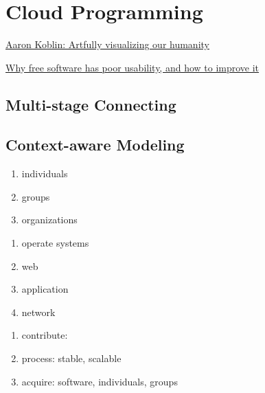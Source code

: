 \documentclass[draftclsnofoot,journal,onecolumn,12pt]{IEEEtran}
\begin{document}
\section{Cloud Programming}

\href{http://www.ted.com/talks/aaron_koblin.html}{Aaron Koblin: Artfully visualizing our humanity}

\href{http://www.mpt.net.nz/2012/06/why-free-software-has-poor-usability/}{Why free software has poor usability, and how to improve it}

\subsection{Multi-stage Connecting}

\subsection{Context-aware Modeling}


\begin{enumerate}
  \item individuals
  \item groups
  \item organizations
\end{enumerate}

\begin{enumerate}
  \item operate systems
  \item web
  \item application
  \item network
\end{enumerate}

\begin{enumerate}
  \item contribute:
  \item process: stable, scalable
  \item acquire: software, individuals, groups
\end{enumerate}


\nocite{Bonaccorsi20031243}
\nocite{chacon2009pro}
\nocite{Hertel20031159}
\nocite{kernighan1999practice}
\nocite{Kogut01062001}
\nocite{scacchi2006understanding}
\nocite{vonKrogh20031149}
\nocite{Yilmaz06techniquesand}

\renewcommand\refname{References}


\end{document}

